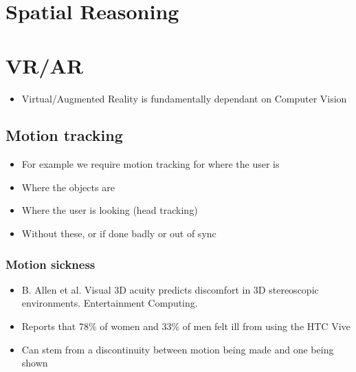 \documentclass[a4paper]{article}
\begin{document}
\section{Spatial Reasoning}
\label{sec-10}

\section{VR/AR}
\label{sec-11}
\begin{itemize}
\item Virtual/Augmented Reality is fundamentally dependant on Computer Vision
\end{itemize}
\subsection{Motion tracking}
\label{sec-11-1}
\begin{itemize}
\item For example we require motion tracking for where the user is
\item Where the objects are
\item Where the user is looking (head tracking)
\item Without these, or if done badly or out of sync
\end{itemize}
\subsubsection{Motion sickness}
\label{sec-11-1-1}
\begin{itemize}
\item B. Allen et al. Visual 3D acuity predicts discomfort in 3D stereoscopic environments. Entertainment Computing.
\item Reports that 78\% of women and 33\% of men felt ill from using the HTC Vive
\item Can stem from a discontinuity between motion being made and one being shown
\end{itemize}
\end{document}
